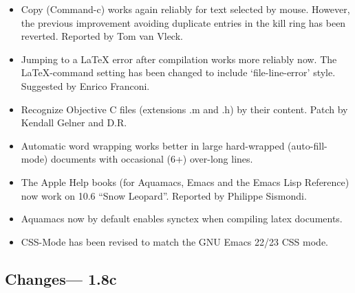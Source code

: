 \begin{itemize}

\item Copy (Command-c) works again reliably for text selected by mouse.   However, the previous improvement avoiding duplicate entries in the kill ring has been reverted.
Reported by Tom van Vleck.

\item Jumping to a LaTeX error after compilation works more reliably now.  The LaTeX-command setting has been changed to include `file-line-error' style.
Suggested by Enrico Franconi.

\item Recognize Objective C files (extensions .m and .h) by their content.
Patch by Kendall Gelner and D.R.

\item Automatic word wrapping works better in large hard-wrapped (auto-fill-mode) documents with occasional (6+) over-long lines.

\item The Apple Help books (for Aquamacs, Emacs and the Emacs Lisp Reference) now work on 10.6 ``Snow Leopard''.
Reported by Philippe Sismondi.

\item Aquamacs now by default enables synctex when compiling latex documents.  

\item CSS-Mode has been revised to match the GNU Emacs 22/23 CSS mode.

\end{itemize}

\subsection{Changes--- 1.8c}

